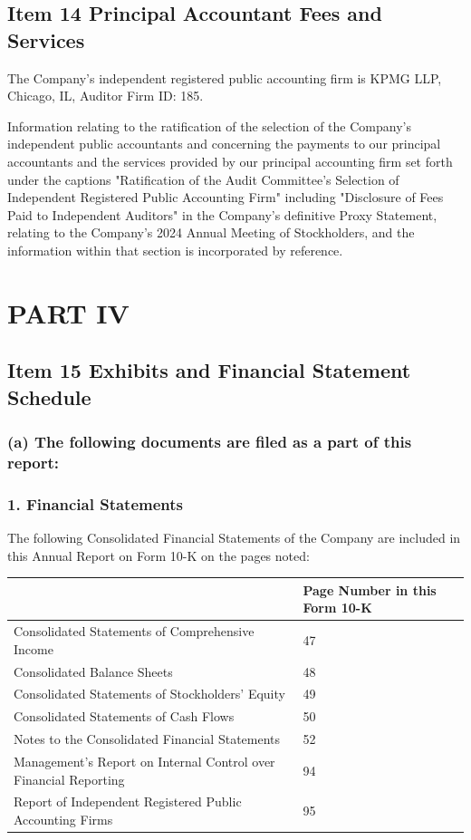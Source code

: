 \subsection{Item 14 Principal Accountant Fees and Services}
The Company's independent registered public accounting firm is KPMG LLP, Chicago, IL, Auditor Firm ID: 185.

Information relating to the ratification of the selection of the Company’s independent public accountants and concerning the payments to our principal accountants and the services provided by our principal accounting firm set forth under the captions "Ratification of the Audit Committee’s Selection of Independent Registered Public Accounting Firm" including "Disclosure of Fees Paid to Independent Auditors" in the Company’s definitive Proxy Statement, relating to the Company’s 2024 Annual Meeting of Stockholders, and the information within that section is incorporated by reference.

\section{PART IV}

\subsection{Item 15 Exhibits and Financial Statement Schedule}

\subsubsection{(a) The following documents are filed as a part of this report:}


\subsubsection{1. Financial Statements}

The following Consolidated Financial Statements of the Company are included in this Annual Report on Form 10-K on the pages noted:

\begin{table}[h]
    \centering
    \begin{tabular}{|l|l|}
        \hline
        & \textbf{Page Number in this Form 10-K} \\ \hline
        Consolidated Statements of Comprehensive Income & 47 \\ \hline
        Consolidated Balance Sheets & 48 \\ \hline
        Consolidated Statements of Stockholders' Equity & 49 \\ \hline
        Consolidated Statements of Cash Flows & 50 \\ \hline
        Notes to the Consolidated Financial Statements & 52 \\ \hline
        Management's Report on Internal Control over Financial Reporting & 94 \\ \hline
        Report of Independent Registered Public Accounting Firms & 95 \\ \hline
    \end{tabular}
\end{table}

